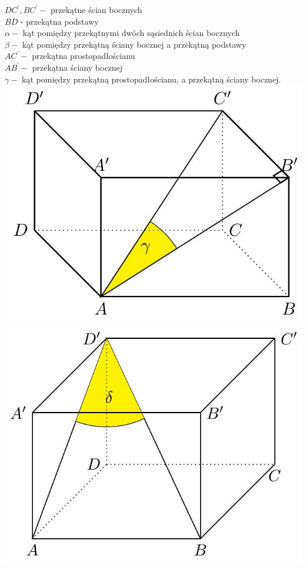 \documentclass[10pt]{article}
\begin{document}
\begin{enumerate}
\(D C^{\prime}, B C^{\prime}-\) przekątne ścian bocznych\\
\(B D\) - przekątna podstawy\\
\(\alpha-\) kąt pomiędzy przekątnymi dwóch sąsiednich ścian bocznych\\
\(\beta-\) kąt pomiędzy przekątną ściany bocznej a przekątną podstawy\\
\(A C^{\prime}-\) przekątna prostopadłościanu\\
\(A B^{\prime}-\) przekątna ściany bocznej\\
\(\gamma-\) kąt pomiędzy przekątną prostopadłościanu, a przekątną ściany bocznej.\\
\includegraphics[max width=\textwidth, center]{2024_11_21_e9b4faa005d5be2cc318g-072}\\
\includegraphics[max width=\textwidth, center]{2024_11_21_e9b4faa005d5be2cc318g-073(2)}\\

\end{enumerate}
\end{document}
